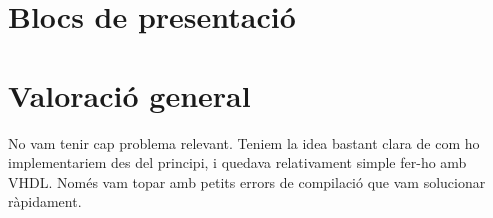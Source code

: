   \cclearpage
\section{Blocs de presentació}

\section{Valoració general}

No vam tenir cap problema relevant. Teniem la idea bastant clara de com ho implementariem des del principi, i quedava relativament simple fer-ho amb VHDL. Només vam topar amb petits errors de compilació que vam solucionar ràpidament.
